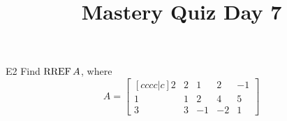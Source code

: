 \documentclass{sbgLAquiz}
\title{Mastery Quiz Day 7 }
\begin{document}
\begin{problem}{E2}
Find \(\operatorname{RREF} A\), where
\[
  A =
  \begin{bmatrix}[cccc|c]
    2 & 2 & 1 & 2 & -1 \\
    1 & 1 & 2 & 4 & 5 \\
    3 & 3 & -1 & -2 & 1
  \end{bmatrix}
\]
\end{problem}
\end{document}
